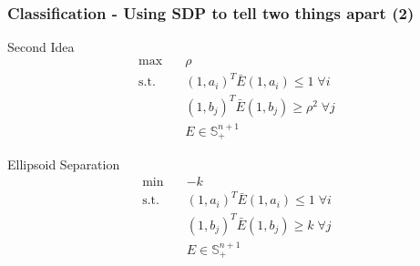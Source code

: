 \documentclass[11pt]{beamer}
\begin{document}
\begin{frame}
	\frametitle{Classification - Using SDP to tell two things apart (2)}
	\begin{block}{Second Idea}
		\begin{equation*}
		\begin{aligned}
		\max\quad& \rho\\
		\text{s.t.}\quad&(1,a_i)^T\bar{E}(1,a_i)\leq 1\;\forall i\\
		&(1,b_j)^T\bar{E}(1,b_j)\geq \rho^2\;\forall j\\
		& E\in\mathbb{S}^{n+1}_+
		\end{aligned}
		\end{equation*}
	\end{block}
	\pause
	\begin{block}{Ellipsoid Separation}
		\begin{equation*}
		\begin{aligned}
		\min\quad& -k\\
		\text{s.t.}\quad&(1,a_i)^T\bar{E}(1,a_i)\leq 1\;\forall i\\
		&(1,b_j)^T\bar{E}(1,b_j)\geq k\;\forall j\\
		& E\in\mathbb{S}^{n+1}_+
		\end{aligned}
		\end{equation*}
	\end{block}
\end{frame}
\end{document}

